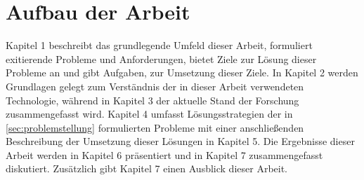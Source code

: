 \section{Aufbau der Arbeit}
Kapitel 1 beschreibt das grundlegende Umfeld dieser Arbeit, formuliert exitierende Probleme und Anforderungen, bietet Ziele zur Lösung dieser Probleme an und gibt Aufgaben, zur Umsetzung dieser Ziele. 
In Kapitel 2 werden Grundlagen gelegt zum Verständnis der in dieser Arbeit verwendeten Technologie, während in Kapitel 3 der aktuelle Stand der Forschung zusammengefasst wird. 
Kapitel 4 umfasst Lösungsstrategien der in \ref{sec:problemstellung} formulierten Probleme mit einer anschließenden Beschreibung der Umsetzung dieser Lösungen in Kapitel 5. 
Die Ergebnisse dieser Arbeit werden in Kapitel 6 präsentiert und in Kapitel 7 zusammengefasst diskutiert. Zusätzlich gibt Kapitel 7 einen Ausblick dieser Arbeit.
